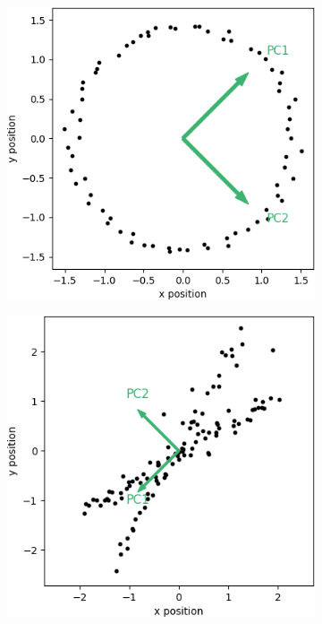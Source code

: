 \begin{figure}
	\centering
	\begin{subfigure}{0.45\linewidth}
		\includegraphics[width=\textwidth]{figs/pca_fails_nonlinear}
		\caption{}
		\label{fig:pca_fails_nonlinear}
	\end{subfigure}
	\hfill
	\begin{subfigure}{0.45\linewidth}
		\includegraphics[width=\textwidth]{figs/pca_fails_nonorthogonal}
		\caption{}
		\label{fig:pca_fails_nonorthogonal}
	\end{subfigure}
	

\end{figure}
